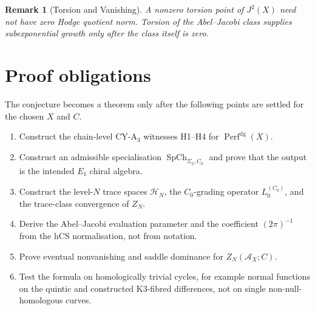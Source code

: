 \documentclass[11pt]{article}
\newtheorem{remark}[theorem]{Remark}
\newcommand{\cA}{\mathcal{A}}
\newcommand{\cH}{\mathcal{H}}
\begin{document}
\begin{remark}[Torsion and Vanishing]
\label{rem:torsion}
A nonzero torsion point of $J^2(X)$ need not have zero Hodge quotient
norm. Torsion of the Abel--Jacobi class supplies subexponential growth
only after the class itself is zero.
\end{remark}

\section{Proof obligations}
\label{sec:obligations}

The conjecture becomes a theorem only after the following points are
settled for the chosen $X$ and $C$.
\begin{enumerate}[label=\textup{(O\arabic*)}]
\item Construct the chain-level CY-A$_3$ witnesses H1--H4 for
  $\operatorname{Perf}^{\mathrm{dg}}(X)$.
\item Construct an admissible specialisation
  $\operatorname{SpCh}_{\Sigma_2,C_0}$ and prove that the output is the
  intended $E_1$ chiral algebra.
\item Construct the level-$N$ trace spaces $\cH_N$, the $C_0$-grading
  operator $L_0^{(C_0)}$, and the trace-class convergence of $Z_N$.
\item Derive the Abel--Jacobi evaluation parameter and the coefficient
  $(2\pi)^{-1}$ from the hCS normalisation, not from notation.
\item Prove eventual nonvanishing and saddle dominance for
  $Z_N(\cA_X;C)$.
\item Test the formula on homologically trivial cycles, for example
  normal functions on the quintic and constructed K3-fibred
  differences, not on single non-null-homologous curves.
\end{enumerate}
\end{document}
